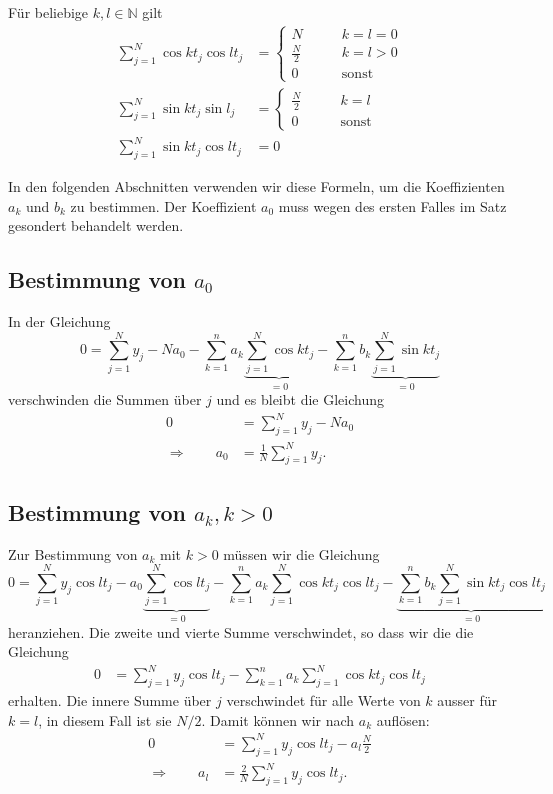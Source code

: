 \begin{satz}
Für beliebige $k,l\in \mathbb N$ gilt
\begin{align*}
\sum_{j=1}^N
\cos kt_j \cos lt_j
&=
\begin{cases}
N                     &\qquad k=l=0\\
\displaystyle\frac{N}2&\qquad k=l > 0\\
0                     &\qquad\text{sonst}
\end{cases}
\\
\sum_{j=1}^N
\sin kt_j \sin l_j
&=
\begin{cases}
\displaystyle \frac{N}2&\qquad k=l\\
0                      &\qquad\text{sonst}
\end{cases}
\\
\sum_{j=1}^N
\sin kt_j \cos lt_j
&=
0
\end{align*}
\end{satz}
In den folgenden Abschnitten verwenden wir diese Formeln, um die
Koeffizienten $a_k$ und $b_k$ zu bestimmen.
Der Koeffizient $a_0$ muss wegen des ersten Falles im Satz gesondert
behandelt werden.

\subsection{Bestimmung von $a_0$}
In der Gleichung
\[
0
=
\sum_{j=1}^Ny_j
-Na_0
-\sum_{k=1}^na_k\underbrace{\sum_{j=1}^N\cos kt_j}_{\displaystyle=0}
-\sum_{k=1}^nb_k\underbrace{\sum_{j=1}^N\sin kt_j}_{\displaystyle=0}
\]
verschwinden die Summen über $j$ und es bleibt die Gleichung
\begin{align*}
0
&=
\sum_{j=1}^Ny_j
-Na_0
\\
\Rightarrow\qquad
a_0&=\frac1{N}\sum_{j=1}^N y_j.
\end{align*}

\subsection{Bestimmung von $a_k, k>0$}
Zur Bestimmung von $a_k$ mit $k>0$ müssen wir die Gleichung
\[
0
=
\sum_{j=1}^N y_j\cos lt_j
-
a_0\underbrace{\sum_{j=1}^N\cos lt_j}_{\displaystyle=0}
-\sum_{k=1}^na_k\sum_{j=1}^N\cos kt_j\cos lt_j
-\underbrace{\sum_{k=1}^nb_k\sum_{j=1}^N\sin kt_j\cos lt_j}_{\displaystyle=0}
\]
heranziehen.
Die zweite und vierte Summe verschwindet, so dass wir die
die Gleichung
\begin{align*}
0&=
\sum_{j=1}^N y_j\cos lt_j
-\sum_{k=1}^na_k\sum_{j=1}^N\cos kt_j\cos lt_j
\end{align*}
erhalten.
Die innere Summe über $j$ verschwindet für alle Werte von $k$ ausser
für $k=l$, in diesem Fall ist sie $N/2$. 
Damit können wir nach $a_k$ auflösen:
\begin{align*}
0&=
\sum_{j=1}^N y_j\cos lt_j
-a_l\frac{N}2
\\
\Rightarrow\qquad 
a_l &= \frac{2}{N}\sum_{j=1}^Ny_j\cos lt_j.
\end{align*}


